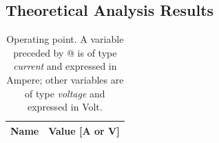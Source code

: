 \subsection{Theoretical Analysis Results}
\begin{table} [H]
  \centering
  \begin{tabular}{|l|r|}
    \hline    
    {\bf Name} & {\bf Value [A or V]} \\ \hline
    
  \end{tabular}
  \caption{Operating point. A variable preceded by @ is of type {\em current}
    and expressed in Ampere; other variables are of type {\it voltage} and expressed in
    Volt.}
  \label{tab:op_analysis}
\end{table}


